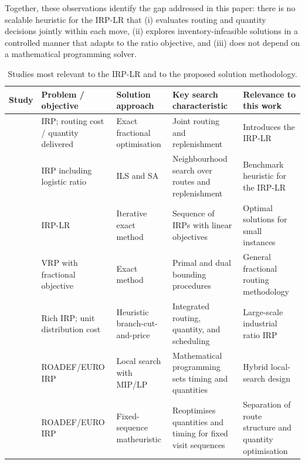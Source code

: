 \documentclass{article}
\begin{document}
Together, these observations identify the gap addressed in this paper:
there is no scalable heuristic for the IRP-LR that (i) evaluates routing and
quantity decisions jointly within each move, (ii) explores
inventory-infeasible solutions in a controlled manner that adapts to the
ratio objective, and (iii) does not depend on a mathematical programming
solver.

\begin{table}[!htbp]
\centering
\caption{Studies most relevant to the IRP-LR and to the proposed solution
methodology.}
\label{tab:literature_irplr}
\scriptsize
\renewcommand{\arraystretch}{1.18}
\setlength{\tabcolsep}{3pt}
\begin{tabularx}{\textwidth}{
>{\raggedright\arraybackslash}p{2.3cm}
>{\raggedright\arraybackslash}p{2.6cm}
>{\raggedright\arraybackslash}p{2.8cm}
>{\raggedright\arraybackslash}X
>{\raggedright\arraybackslash}X}
\toprule
\textbf{Study} & \textbf{Problem / objective} & \textbf{Solution approach}
& \textbf{Key search characteristic} & \textbf{Relevance to this work} \\
\midrule
\citet{archetti2017logistic} & IRP; routing cost / quantity delivered
  & Exact fractional optimisation & Joint routing and replenishment
  & Introduces the IRP-LR \\
\citet{alvarez2018iterated} & IRP including logistic ratio
  & ILS and SA & Neighbourhood search over routes and replenishment
  & Benchmark heuristic for the IRP-LR \\
\citet{archetti2019exact} & IRP-LR & Iterative exact method
  & Sequence of IRPs with linear objectives
  & Optimal solutions for small instances \\
\citet{baldacci2020fractional} & VRP with fractional objective
  & Exact method & Primal and dual bounding procedures
  & General fractional routing methodology \\
\citet{absi2020branch} & Rich IRP; unit distribution cost
  & Heuristic branch-cut-and-price
  & Integrated routing, quantity, and scheduling
  & Large-scale industrial ratio IRP \\
\citet{su2020matheuristic} & ROADEF/EURO IRP & Local search with MIP/LP
  & Mathematical programming sets timing and quantities
  & Hybrid local-search design \\
\citet{he2020fixedsequence} & ROADEF/EURO IRP
  & Fixed-sequence matheuristic
  & Reoptimises quantities and timing for fixed visit sequences
  & Separation of route structure and quantity optimisation \\

\end{tabularx}
\end{table}
\end{document}
